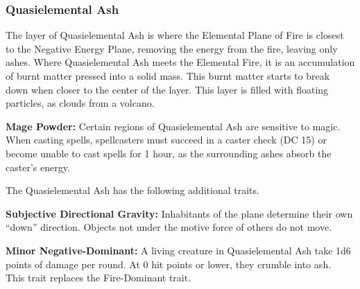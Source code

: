 \subsubsection{Quasielemental Ash}
The layer of Quasielemental Ash is where the Elemental Plane of Fire is closest to the Negative Energy Plane, removing the energy from the fire, leaving only ashes. Where Quasielemental Ash meets the Elemental Fire, it is an accumulation of burnt matter pressed into a solid mass. This burnt matter starts to break down when closer to the center of the layer. This layer is filled with floating particles, as clouds from a volcano.

\textbf{Mage Powder:} Certain regions of Quasielemental Ash are sensitive to magic. When casting spells, spellcasters must succeed in a caster check (DC 15) or become unable to cast spells for 1 hour, as the surrounding ashes absorb the caster's energy.

The Quasielemental Ash has the following additional traits.
\begin{itemize*}
\item \textbf{Subjective Directional Gravity:} Inhabitants of the plane determine their own ``down'' direction. Objects not under the motive force of others do not move.

\item \textbf{Minor Negative-Dominant:} A living creature in Quasielemental Ash take 1d6 points of damage per round. At 0 hit points or lower, they crumble into ash.\\

This trait replaces the Fire-Dominant trait.
\end{itemize*}
